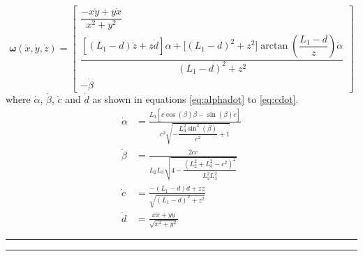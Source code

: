     \begin{equation}\label{eq:rate}
        \bm{\omega}(\dot{x}, \dot{y}, \dot{z}) =
                            \begin{bmatrix}
                                \dfrac{- x\dot{y} + y \dot{x}}{x^2 + y^2}\\[0.5cm]
                                \dfrac{\left[(L_1 - d)\dot{z} + z\dot{d}\right]\alpha + \Big[(L_1 - d)^2 + z^2\Big]\arctan{\left(\dfrac{L_1-d}{z}\right)}\dot{\alpha}}{(L_1 - d)^2 + z^2}\\[0.8cm]
                                -\dot{\beta} 
                            \end{bmatrix}
    \end{equation}
    where \(\dot\alpha\), \(\dot\beta\), \(\dot{c}\) and \(\dot{d}\) as shown in equations \ref{eq:alphadot} to \ref{eq:cdot}.
    \begin{align}
        \dot{\alpha} &= \frac{ L_3\left[ c\cos(\beta)\dot{\beta} - \sin(\beta)\dot{c} \right] }{ c^2\sqrt{-\dfrac{L_3^2\sin^2(\beta)}{c^2}+1} } \label{eq:alphadot} \\[0.5cm] 
        \dot{\beta} &= \frac{ 2c\dot{c} }{ L_2L_3\sqrt{4 - \dfrac{(L_2^2+L_3^2-c^2)^2}{L_2^2L_3^2}} } \label{eq:betadot} \\[0.5cm]
        \dot{c} &= \frac{-(L_1 - d)\dot{d} + z\dot{z}}{\sqrt{(L_1 - d)^2 + z^2}} \label{eq:bdot} \\[0.5cm]
        \dot{d} &= \frac{x\dot{x} + y\dot{y}}{\sqrt{x^2 + y^2}} \label{eq:cdot}
    \end{align}
    
    \bigskip
    \hrule
    \smallbreak
    \hrule
